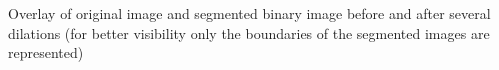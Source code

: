 \label{fig:NucOverlayDilate} Overlay of original image and segmented binary image before and after several dilations (for better visibility only the boundaries of the segmented images are represented)